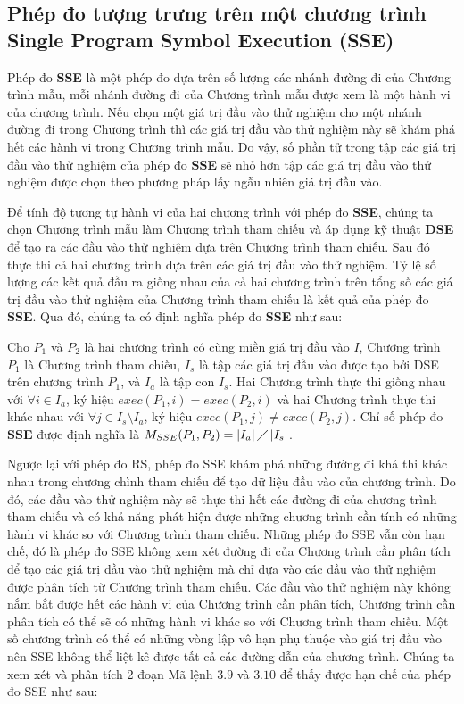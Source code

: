 \subsection{Phép đo tượng trưng trên một chương trình Single Program Symbol Execution (SSE)}
Phép đo \textbf{SSE} là một phép đo dựa trên số lượng các nhánh đường đi của Chương trình mẫu, mỗi nhánh đường đi của Chương trình mẫu được xem là một hành vi của chương trình. Nếu chọn một giá trị đầu vào thử nghiệm cho một nhánh đường đi trong Chương trình thì các giá trị đầu vào thử nghiệm này sẽ khám phá hết các hành vi trong Chương trình mẫu. Do vậy, số phần tử trong tập các giá trị đầu vào thử nghiệm của phép đo \textbf{SSE} sẽ nhỏ hơn tập các giá trị đầu vào thử nghiệm được chọn theo phương pháp lấy ngẫu nhiên giá trị đầu vào. 

Để tính độ tương tự hành vi của hai chương trình với phép đo \textbf{SSE}, chúng ta chọn Chương trình mẫu làm Chương trình tham chiếu và áp dụng kỹ thuật \textbf{DSE} để tạo ra các đầu vào thử nghiệm dựa trên Chương trình tham chiếu. Sau đó thực thi cả hai chương trình dựa trên các giá trị đầu vào thử nghiệm. Tỷ lệ số lượng các kết quả đầu ra giống nhau của cả hai chương trình trên tổng số các giá trị đầu vào thử nghiệm của Chương trình tham chiếu là kết quả của phép đo \textbf{SSE}. Qua đó, chúng ta có định nghĩa phép đo \textbf{SSE} như sau:

\begin{definition}
 Cho $P_{1}$ và $P_{2}$ là hai chương trình có cùng miền giá trị đầu vào $I$, Chương trình $P_{1}$ là Chương trình tham chiếu, $I_{s}$ là tập các giá trị đầu vào được tạo bởi DSE trên chương trình $P_{1}$, và $I_{a}$ là tập con $I_{s}$. Hai Chương trình thực thi giống nhau với $\forall i \in I_{a}$, ký hiệu $exec(P_{1}, i) = exec(P_{2}, i)$ và hai Chương trình thực thi khác nhau với $\forall j \in I_{s} \setminus I_{a}$, ký hiệu $exec(P_{1}, j) \neq exec(P_{2}, j)$. Chỉ số phép đo \textbf{SSE} được định nghĩa là $M_{SSE}(P_{1}, P_{2}) = \left|I_{a}\right| \diagup \left|I_{s}\right| $.
\end{definition}

Ngược lại với phép đo RS, phép đo SSE khám phá những đường đi khả thi khác nhau trong chương chình tham chiếu để tạo dữ liệu đầu vào của chương trình. Do đó, các đầu vào thử nghiệm này sẽ thực thi hết các đường đi của chương trình tham chiếu và có khả năng phát hiện được những chương trình cần tính có những hành vi khác so với Chương trình tham chiếu. Những phép đo SSE vẫn còn hạn chế, đó là phép đo SSE không xem xét đường đi của Chương trình cần phân tích để tạo các giá trị đầu vào thử nghiệm mà chỉ dựa vào các đầu vào thử nghiệm được phân tích từ Chương trình tham chiếu. Các đầu vào thử nghiệm này không nắm bắt được hết các hành vi của Chương trình cần phân tích, Chương trình cần phân tích có thể sẽ có những hành vi khác so với Chương trình tham chiếu. Một số chương trình có thể có những vòng lập vô hạn phụ thuộc vào giá trị đầu vào nên SSE không thể liệt kê được tất cả các đường dẫn của chương trình. Chúng ta xem xét và phân tích 2 đoạn Mã lệnh $3.9$ và $3.10$ để thấy được hạn chế của phép đo SSE như sau:


